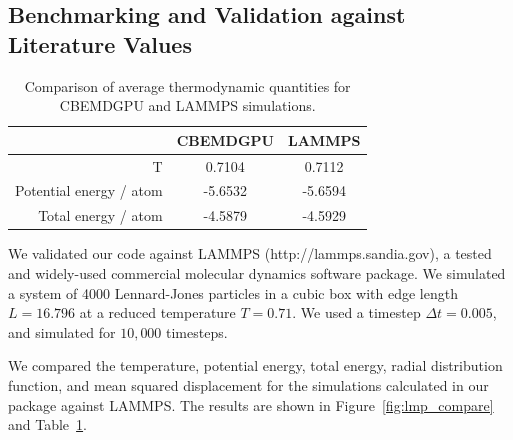 \documentclass[12pt]{article}
\begin{document}
\subsection{Benchmarking and Validation against Literature Values}

\begin{table}[H]
\begin{centering}
	\begin{tabular}{| r | c | c |}
		\hline
		 & CBEMDGPU & LAMMPS \\
		 \hline
		 T & 0.7104 & 0.7112 \\
		 \hline
		 Potential energy / atom & -5.6532 & -5.6594 \\
		 \hline
		 Total energy / atom & -4.5879 & -4.5929 \\
		 \hline
	\end{tabular}
	\caption{Comparison of average thermodynamic quantities for CBEMDGPU and LAMMPS simulations.}
	\label{table:lmp_compare}
\end{centering}
\end{table}

We validated our code against LAMMPS \cite{Plimpton1995} (http://lammps.sandia.gov), a tested and widely-used commercial molecular dynamics software package.
%
We simulated a system of 4000 Lennard-Jones particles in a cubic box with edge length $L=16.796$ at a reduced temperature $T=0.71$.
%
We used a timestep $\Delta t=0.005$, and simulated for $10,000$ timesteps.

We compared the temperature, potential energy, total energy, radial distribution function, and mean squared displacement for the simulations calculated in our package against LAMMPS.
%
The results are shown in Figure~\ref{fig:lmp_compare} and Table~\ref{table:lmp_compare}.
%
\end{document}
